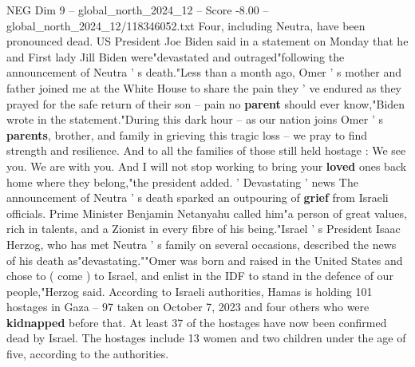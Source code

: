 \begin{textsample}{NEG Dim 9 – global\_north\_2024\_12 – Score -8.00 – global\_north\_2024\_12/118346052.txt}
Four, including Neutra, have been pronounced dead.
US President Joe Biden said in a statement on Monday that he and First lady Jill Biden were"devastated and outraged"following the announcement of Neutra ' s death."Less than a month ago, Omer ' s mother and father joined me at the White House to share the pain they ' ve endured as they prayed for the safe return of their son -- pain no \textbf{parent} should ever know,"Biden wrote in the statement."During this dark hour -- as our nation joins Omer ' s \textbf{parents}, brother, and family in grieving this tragic loss -- we pray to find strength and resilience.
And to all the families of those still held hostage : We see you.
We are with you.
And I will not stop working to bring your \textbf{loved} ones back home where they belong,"the president added. ' Devastating ' news The announcement of Neutra ' s death sparked an outpouring of \textbf{grief} from Israeli officials.
Prime Minister Benjamin Netanyahu called him"a person of great values, rich in talents, and a Zionist in every fibre of his being."Israel ' s President Isaac Herzog, who has met Neutra ' s family on several occasions, described the news of his death as"devastating.""Omer was born and raised in the United States and chose to ( come ) to Israel, and enlist in the IDF to stand in the defence of our people,"Herzog said.
According to Israeli authorities, Hamas is holding 101 hostages in Gaza -- 97 taken on October 7, 2023 and four others who were \textbf{kidnapped} before that.
At least 37 of the hostages have now been confirmed dead by Israel.
The hostages include 13 women and two children under the age of five, according to the authorities.

\end{textsample}
